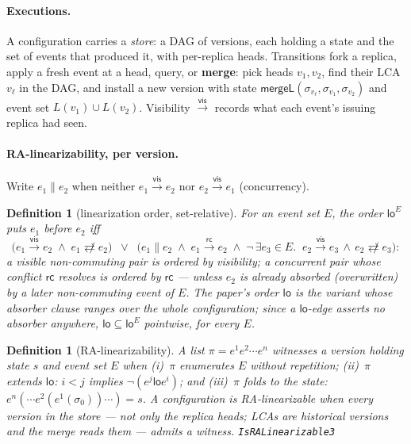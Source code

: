 \documentclass[11pt]{article}
\newtheorem{definition}[theorem]{Definition}
\newcommand{\vis}{\xrightarrow{\mathsf{vis}}}
\newcommand{\rc}{\xrightarrow{\mathsf{rc}}}
\newcommand{\ncomm}{\not\rightleftarrows}
\newcommand{\mergeL}{\mathsf{mergeL}}
\newcommand{\Sinit}{\sigma_0}
\newcommand{\loE}[1]{\mathsf{lo}^{#1}}
\newcommand{\lean}[1]{\texttt{#1}}
\begin{document}
\paragraph{Executions.} A configuration carries a \emph{store}: a DAG of
versions, each holding a state and the set of events that produced it,
with per-replica heads. Transitions fork a replica, apply a fresh event at
a head, query, or \textbf{merge}: pick heads $v_1, v_2$, find their LCA
$v_\ell$ in the DAG, and install a new version with state
$\mergeL(\sigma_{v_\ell}, \sigma_{v_1}, \sigma_{v_2})$ and event set
$L(v_1) \cup L(v_2)$. Visibility $\vis$ records what each event's issuing
replica had seen.

\paragraph{RA-linearizability, per version.} Write $e_1 \parallel e_2$
when neither $e_1 \vis e_2$ nor $e_2 \vis e_1$ (concurrency).

\begin{definition}[linearization order, set-relative]
\label{def:lo}
For an event set $E$, the order $\loE{E}$ puts $e_1$ before $e_2$ iff
\[
\bigl(e_1 \vis e_2 \;\wedge\; e_1 \ncomm e_2\bigr)
\;\;\vee\;\;
\bigl(e_1 \parallel e_2 \;\wedge\; e_1 \rc e_2 \;\wedge\;
  \neg\,\exists e_3 \in E.\;\; e_2 \vis e_3 \,\wedge\, e_2 \ncomm e_3\bigr):
\]
a visible non-commuting pair is ordered by visibility; a concurrent pair
whose conflict $\mathsf{rc}$ resolves is ordered by $\mathsf{rc}$ ---
unless $e_2$ is already \emph{absorbed} (overwritten) by a later
non-commuting event of $E$. The paper's order $\mathsf{lo}$ is the
variant whose absorber clause ranges over the whole configuration; since
a $\mathsf{lo}$-edge asserts \emph{no absorber anywhere},
$\mathsf{lo} \subseteq \loE{E}$ pointwise, for every $E$.
\end{definition}

\begin{definition}[RA-linearizability]
\label{def:ralin}
A list $\pi = e^1 e^2 \cdots e^n$ \emph{witnesses} a version holding
state $s$ and event set $E$ when (i)~$\pi$ enumerates $E$ without
repetition; (ii)~$\pi$ \emph{extends} $\mathsf{lo}$: $i < j$ implies
$\neg(e^j \mathrel{\mathsf{lo}} e^i)$; and (iii)~$\pi$ \emph{folds} to
the state: $e^n(\cdots e^2(e^1(\Sinit))\cdots) = s$. A configuration is
\emph{RA-linearizable} when \emph{every version in the store} --- not
only the replica heads; LCAs are historical versions and the merge reads
them --- admits a witness. \hfill\lean{IsRALinearizable3}
\end{definition}
\end{document}
